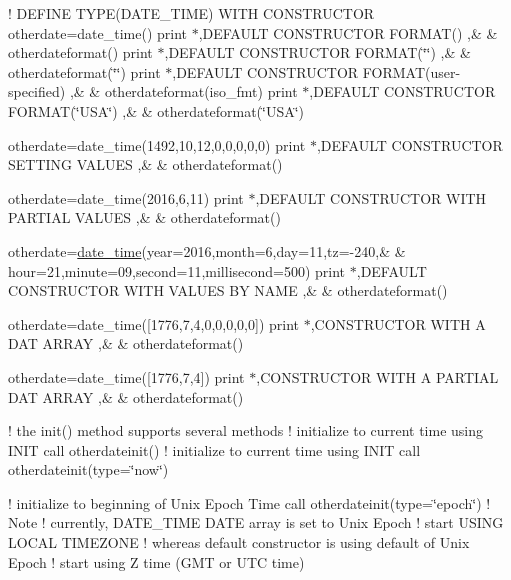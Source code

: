 ! D\+E\+F\+I\+NE T\+Y\+P\+E(\+D\+A\+T\+E\+\_\+\+T\+I\+M\+E) W\+I\+TH C\+O\+N\+S\+T\+R\+U\+C\+T\+OR otherdate=date\+\_\+time() print $\ast$,\textquotesingle{}D\+E\+F\+A\+U\+LT C\+O\+N\+S\+T\+R\+U\+C\+T\+OR F\+O\+R\+M\+AT() \textquotesingle{},\& \& otherdateformat() print $\ast$,\textquotesingle{}D\+E\+F\+A\+U\+LT C\+O\+N\+S\+T\+R\+U\+C\+T\+OR F\+O\+R\+M\+AT(\char`\"{}\char`\"{}) \textquotesingle{},\& \& otherdateformat(\char`\"{}\char`\"{}) print $\ast$,\textquotesingle{}D\+E\+F\+A\+U\+LT C\+O\+N\+S\+T\+R\+U\+C\+T\+OR F\+O\+R\+M\+AT(user-\/specified) \textquotesingle{},\& \& otherdateformat(iso\+\_\+fmt) print $\ast$,\textquotesingle{}D\+E\+F\+A\+U\+LT C\+O\+N\+S\+T\+R\+U\+C\+T\+OR F\+O\+R\+M\+AT(\char`\"{}\+U\+S\+A\char`\"{}) \textquotesingle{},\& \& otherdateformat(\char`\"{}\+U\+S\+A\char`\"{})

otherdate=date\+\_\+time(1492,10,12,0,0,0,0,0) print $\ast$,\textquotesingle{}D\+E\+F\+A\+U\+LT C\+O\+N\+S\+T\+R\+U\+C\+T\+OR S\+E\+T\+T\+I\+NG V\+A\+L\+U\+ES \textquotesingle{},\& \& otherdateformat()

otherdate=date\+\_\+time(2016,6,11) print $\ast$,\textquotesingle{}D\+E\+F\+A\+U\+LT C\+O\+N\+S\+T\+R\+U\+C\+T\+OR W\+I\+TH P\+A\+R\+T\+I\+AL V\+A\+L\+U\+ES \textquotesingle{},\& \& otherdateformat()

otherdate=\mbox{\hyperlink{structm__time__oop_1_1date__time}{date\+\_\+time}}(year=2016,month=6,day=11,tz=-\/240,\& \& hour=21,minute=09,second=11,millisecond=500) print $\ast$,\textquotesingle{}D\+E\+F\+A\+U\+LT C\+O\+N\+S\+T\+R\+U\+C\+T\+OR W\+I\+TH V\+A\+L\+U\+ES BY N\+A\+ME \textquotesingle{},\& \& otherdateformat()

otherdate=date\+\_\+time(\mbox{[}1776,7,4,0,0,0,0,0\mbox{]}) print $\ast$,\textquotesingle{}C\+O\+N\+S\+T\+R\+U\+C\+T\+OR W\+I\+TH A D\+AT A\+R\+R\+AY \textquotesingle{},\& \& otherdateformat()

otherdate=date\+\_\+time(\mbox{[}1776,7,4\mbox{]}) print $\ast$,\textquotesingle{}C\+O\+N\+S\+T\+R\+U\+C\+T\+OR W\+I\+TH A P\+A\+R\+T\+I\+AL D\+AT A\+R\+R\+AY \textquotesingle{},\& \& otherdateformat()

! the init() method supports several methods ! initialize to current time using I\+N\+IT call otherdateinit() ! initialize to current time using I\+N\+IT call otherdateinit(type=\char`\"{}now\char`\"{})

! initialize to beginning of Unix Epoch Time call otherdateinit(type=\char`\"{}epoch\char`\"{}) ! Note ! currently, D\+A\+T\+E\+\_\+\+T\+I\+ME D\+A\+TE array is set to Unix Epoch ! start U\+S\+I\+NG L\+O\+C\+AL T\+I\+M\+E\+Z\+O\+NE ! whereas default constructor is using default of Unix Epoch ! start using Z time (G\+MT or U\+TC time)

